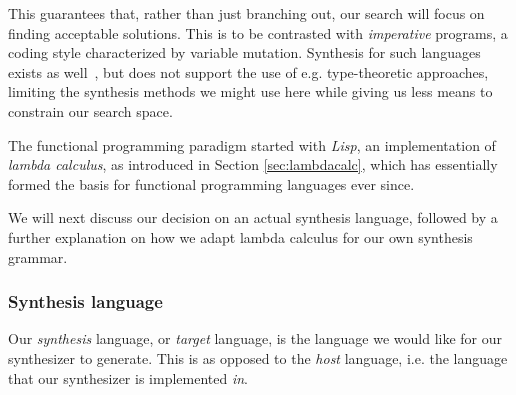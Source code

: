 \documentclass{article}
\begin{document}
This guarantees that, rather than just branching out,
our search will focus on finding acceptable solutions.
This is to be contrasted with \emph{imperative} programs,
a coding style characterized by variable mutation.
Synthesis for such languages exists as well~\citep{shi2019frangel},
but does not support the use of e.g. type-theoretic approaches,
limiting the synthesis methods we might use here
while giving us less means to constrain our search space.

The functional programming paradigm started with \emph{Lisp},
an implementation of \emph{lambda calculus},
as introduced in Section \ref{sec:lambdacalc},
which has essentially formed the basis for functional programming languages ever since.

We will next discuss 
our decision on an actual synthesis language,
followed by a further explanation on how we adapt lambda calculus for our own synthesis grammar.

\subsubsection{Synthesis language}

Our \emph{synthesis} language, or \emph{target} language,
is the language we would like for our synthesizer to generate.
This is as opposed to the \emph{host} language,
i.e. the language that our synthesizer is implemented \emph{in}.
\end{document}
